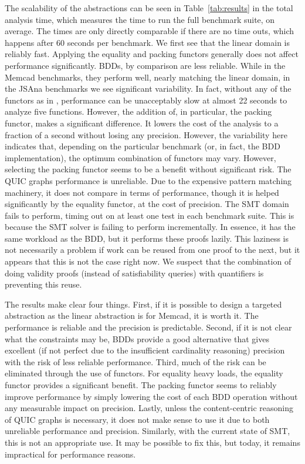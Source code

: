 The scalability of the abstractions can be seen in Table~\ref{tab:results} in the total analysis time, which measures the time to run the full benchmark suite, on average.  The times are only directly comparable if there are no time outs, which happens after 60 seconds per benchmark.  We first see that the linear domain is reliably fast.  Applying the equality and packing functors generally does not affect performance significantly.  BDDs, by comparison are less reliable.  While in the Memcad benchmarks, they perform well, nearly matching the linear domain, in the JSAna benchmarks we see significant variability.  In fact, without any of the functors as in \cite{ab:ecoop:13}, performance can be unacceptably slow at almost 22 seconds to analyze five functions.  However, the addition of, in particular, the packing functor, makes a significant difference.  It lowers the cost of the analysis to a fraction of a second without losing any precision.  However, the variability here indicates that, depending on the particular benchmark (or, in fact, the BDD implementation), the optimum combination of functors may vary.  However, selecting the packing functor seems to be a benefit without significant risk.  The QUIC graphs performance is unreliable.  Due to the expensive pattern matching machinery, it does not compare in terms of performance, though it is helped significantly by the equality functor, at the cost of precision.  The SMT domain fails to perform, timing out on at least one test in each benchmark suite.  This is because the SMT solver is failing to perform incrementally.  In essence, it has the same workload as the BDD, but it performs these proofs lazily.  This laziness is not necessarily a problem if work can be reused from one proof to the next, but it appears that this is not the case right now.  We suspect that the combination of doing validity proofs (instead of satisfiability queries) with quantifiers is preventing this reuse.

The results make clear four things.  First, if it is possible to design a targeted abstraction as the linear abstraction is for Memcad, it is worth it.  The performance is reliable and the precision is predictable.  Second, if it is not clear what the constraints may be, BDDs provide a good alternative that gives excellent (if not perfect due to the insufficient cardinality reasoning) precision with the risk of less reliable performance.  Third, much of the risk can be eliminated through the use of functors.  For equality heavy loads, the equality functor provides a significant benefit.  The packing functor seems to reliably improve performance by simply lowering the cost of each BDD operation without any measurable impact on precision.  Lastly, unless the content-centric reasoning of QUIC graphs is necessary, it does not make sense to use it due to both unreliable performance and precision.  Similarly, with the current state of SMT, this is not an appropriate use.  It may be possible to fix this, but today, it remains impractical for performance reasons.







